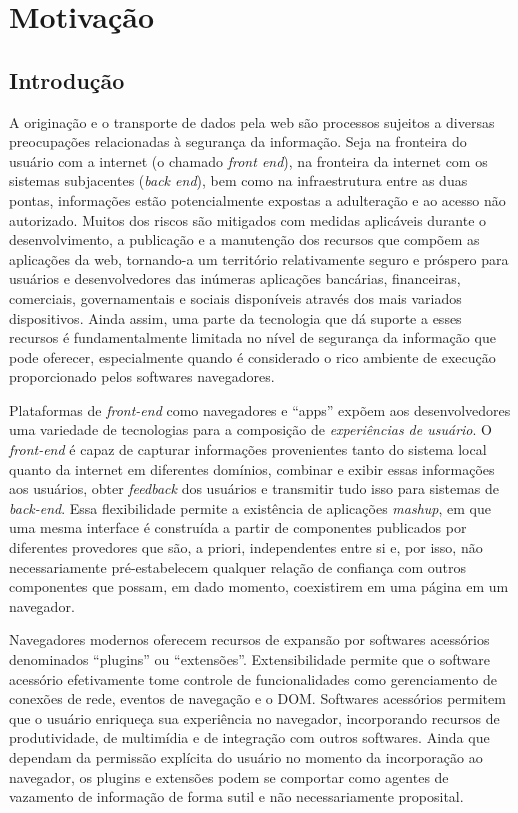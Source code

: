 \chapter{Motivação}
\section{Introdução}
A originação e o transporte de dados pela web são processos sujeitos a diversas preocupações relacionadas à segurança da informação. Seja na fronteira do usuário com a internet (o chamado \textit{front end}), na fronteira da internet com os sistemas subjacentes (\textit{back end}), bem como na infraestrutura entre as duas pontas, informações estão potencialmente expostas a adulteração e ao acesso não autorizado. Muitos dos riscos são mitigados com medidas aplicáveis durante o desenvolvimento, a publicação e a manutenção dos recursos que compõem as aplicações da web, tornando-a um território relativamente seguro e próspero para usuários e desenvolvedores das inúmeras aplicações bancárias, financeiras, comerciais, governamentais e sociais disponíveis através dos mais variados dispositivos. Ainda assim, uma parte da tecnologia que dá suporte a esses recursos é fundamentalmente limitada no nível de segurança da informação que pode oferecer, especialmente quando é considerado o rico ambiente de execução proporcionado pelos softwares navegadores.

Plataformas de \textit{front-end} como navegadores e ``apps'' expõem aos desenvolvedores uma variedade de tecnologias para a composição de \textit{experiências de usuário}. O \textit{front-end} é capaz de capturar informações  provenientes tanto do sistema local quanto da internet em diferentes domínios, combinar e exibir essas informações aos usuários, obter \textit{feedback} dos usuários e transmitir tudo isso para sistemas de \textit{back-end}. Essa flexibilidade permite a existência de aplicações \textit{mashup}, em que uma mesma interface é construída a partir de componentes publicados por diferentes provedores que são, a priori, independentes entre si e, por isso, não necessariamente pré-estabelecem qualquer relação de confiança com outros componentes que possam, em dado momento, coexistirem em uma página em um navegador.

Navegadores modernos oferecem recursos de expansão por softwares acessórios denominados ``plugins'' ou ``extensões''. Extensibilidade permite que o software acessório efetivamente tome controle de funcionalidades como gerenciamento de conexões de rede, eventos de navegação e o DOM. Softwares acessórios permitem que o usuário enriqueça sua experiência no navegador, incorporando recursos de produtividade, de multimídia e de integração com outros softwares. Ainda que dependam da permissão explícita do usuário no momento da incorporação ao navegador, os plugins e extensões podem se comportar como agentes de vazamento de informação de forma sutil e não necessariamente proposital.

